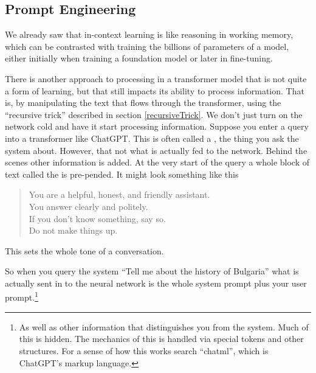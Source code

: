 \subsection{Prompt Engineering} 

We already saw that in-context learning is like reasoning in working memory,
which can be contrasted with training the billions of parameters of a model,
either initially when training a foundation model or later in fine-tuning.

There is another approach to processing in a transformer model that is not
quite a form of learning, but that still impacts its ability to process
information.  That is, by manipulating the text that flows through the
transformer, using the ``recursive trick'' described in section
\ref{recursiveTrick}.  We don't just turn on the network cold and have it start
processing information.  Suppose you enter a  query into a transformer like
ChatGPT. This is  often called a , the thing you ask the
system about. However, that  not what is actually fed to the network. Behind
the scenes other information is added.  At the very start of the query a whole
block of text called the  is pre-pended. It might look
something like this

\begin{quote}
You are a helpful, honest, and friendly assistant.\\
You answer clearly and politely.\\
If you don't know something, say so.\\
Do not make things up.
\end{quote}

This sets the whole tone of a conversation. 

So when you query the system ``Tell me about the history of Bulgaria'' what is
actually sent in to the neural network is the whole system prompt plus your
user prompt.\footnote{As well as other information that distinguishes you from
the system. Much of this is hidden. The mechanics of this is handled via
special tokens and other structures. For a sense of how this works search
``chatml'', which is ChatGPT's markup language.}

